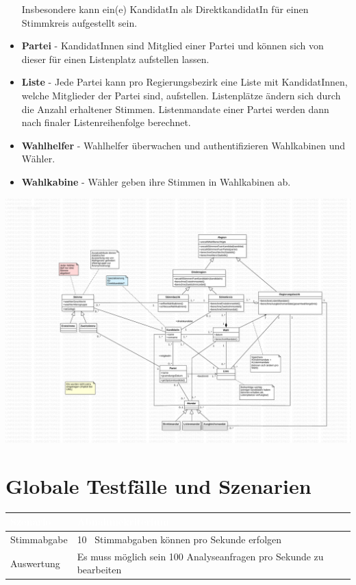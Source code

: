 \documentclass[a4paper,12pt]{article}
\begin{document}
\begin{itemize}
        Insbesondere kann ein(e) KandidatIn als DirektkandidatIn für einen Stimmkreis aufgestellt sein.
  \item \textbf{Partei} - KandidatInnen sind Mitglied einer Partei und können sich von dieser für einen 
        Listenplatz aufstellen lassen.
  \item \textbf{Liste} - Jede Partei kann pro Regierungsbezirk eine Liste mit KandidatInnen, welche Mitglieder der 
        Partei sind, aufstellen. Listenplätze ändern sich durch die Anzahl erhaltener Stimmen. Listenmandate
        einer Partei werden dann nach finaler Listenreihenfolge berechnet.
  \item \textbf{Wahlhelfer} - Wahlhelfer überwachen und authentifizieren Wahlkabinen und Wähler.
  \item \textbf{Wahlkabine} - Wähler geben ihre Stimmen in Wahlkabinen ab.
\end{itemize}

\begin{center}
	\includegraphics[page=2,width=\textwidth]{../model.pdf}
\end{center}

\section{Globale Testfälle und Szenarien}
\begin{center}
      \begin{tabular}{|m{3.5cm}|m{12cm}|}
        \hline
        \rowcolor{TUMBlue} \textcolor{white}{\textbf{Szenario}} & \textcolor{white}{\textbf{Abnahmekriterium}} \\
        \hline
        Stimmabgabe & 10~ Stimmabgaben können pro Sekunde erfolgen \\
        \hline
        Auswertung & Es muss möglich sein 100 Analyseanfragen pro Sekunde zu bearbeiten \\
        \hline
      \end{tabular}
\end{center}

\clearpage

\end{document}
